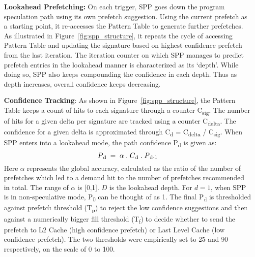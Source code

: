 
\noindent \textbf{Lookahead Prefetching:} On each trigger, SPP goes
down the program speculation path using its own prefetch suggestion.
Using the current prefetch as a starting point, it re-accesses the Pattern
Table to generate further prefetches.  As illustrated in
Figure~\ref{fig:spp_structure}, it repeats the cycle of accessing
Pattern Table and updating the signature based on highest confidence
prefetch from the last iteration.  The iteration counter on which SPP
manages to predict prefetch entries in the lookahead manner is
characterized as its `depth'. While doing so, SPP also keeps
compounding the confidence in each depth. Thus as depth increases,
overall confidence keeps decreasing.

\noindent \textbf{Confidence Tracking}: As shown in
Figure~\ref{fig:spp_structure}, the Pattern Table keeps a count of
hits to each signature through a counter C\textsubscript{sig}. The
number of hits for a given delta per signature are tracked using a
counter C\textsubscript{delta}.  The confidence for a given delta is
approximated through C\textsubscript{d} = C\textsubscript{delta} /
C\textsubscript{sig}.  When SPP enters into a lookahead mode, the path
confidence P\textsubscript{d} is given as:
$$P\textsubscript{d} \;=\; \alpha  \;.\;  C\textsubscript{d}  \;.\;
P\textsubscript{d-1}$$ Here $\alpha$ represents the global accuracy,
calculated as the ratio of the number of prefetches which led to a
demand hit to the number of prefetches recommended in total. The range
of $\alpha$ is [0,1].  $D$ is the lookahead depth. For $d = 1$, when
SPP is in non-speculative mode, P\textsubscript{0} can be thought of
as 1.  The final P\textsubscript{d} is thresholded against prefetch
threshold (T\textsubscript{p}) to reject the low confidence
suggestions and then against a numerically bigger fill threshold
(T\textsubscript{f}) to decide whether to send the prefetch to
L2 Cache (high confidence prefetch) or Last Level Cache (low
confidence prefetch). The two thresholds were empirically set to 25
and 90 respectively, on the scale of 0 to 100.


